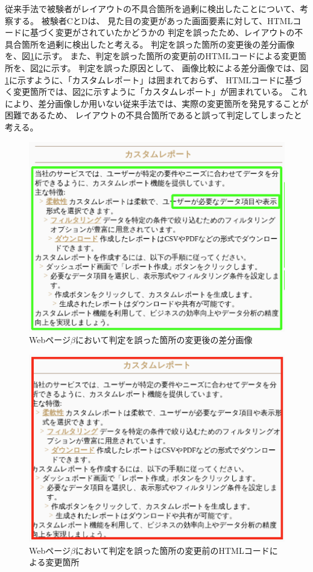 従来手法で被験者がレイアウトの不具合箇所を過剰に検出したことについて、考察する。
被験者CとDは、
見た目の変更があった画面要素に対して、HTMLコードに基づく変更がされていたかどうかの
判定を誤ったため、レイアウトの不具合箇所を過剰に検出したと考える。
判定を誤った箇所の変更後の差分画像を、図\ref{fig:app1}に示す。
また、判定を誤った箇所の変更前のHTMLコードによる変更箇所を、図\ref{fig:app2}に示す。
判定を誤った原因として、
画像比較による差分画像では、図\ref{fig:app1}に示すように、「カスタムレポート」は囲まれておらず、
HTMLコードに基づく変更箇所では、図\ref{fig:app2}に示すように「カスタムレポート」が囲まれている。
これにより、差分画像しか用いない従来手法では、実際の変更箇所を発見することが困難であるため、
レイアウトの不具合箇所であると誤って判定してしまったと考える。
\begin{figure}[tp]
    \centering
    \includegraphics[width=1.0\textwidth]{image/6/miss_af_img.png}
    \caption{Webページ$\beta$において判定を誤った箇所の変更後の差分画像}
    \label{fig:app1}
\end{figure}

\begin{figure}[tp]
    \centering
    \includegraphics[width=1.0\textwidth]{image/6/miss_bf_html.png}
    \caption{Webページ$\beta$において判定を誤った箇所の変更前のHTMLコードによる変更箇所}
    \label{fig:app2}
\end{figure}

